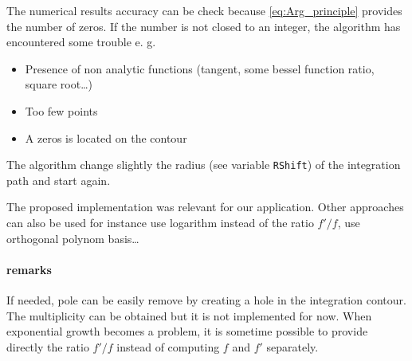 \documentclass[a4paper,10pt]{article}
\begin{document}

%





The numerical results accuracy can be check because \eqref{eq:Arg_principle} provides the number of zeros. If the number is not closed to an integer, the algorithm has encountered some trouble e. g. 
\begin{itemize}
\item Presence of non analytic functions (tangent, some bessel function ratio, square root\dots)
\item Too few points
\item A zeros is located on the contour
\end{itemize}
The algorithm change slightly the radius (see variable \texttt{RShift}) of the integration path and start again.

The proposed implementation was relevant for our application. Other approaches can also be used for instance use logarithm instead of the ratio $f'/f$, use orthogonal polynom basis\dots


\paragraph{remarks}
If needed, pole can be easily remove by creating a hole in the integration contour. The multiplicity can be obtained but it is not implemented for now. When exponential growth becomes a problem, it is sometime possible to provide directly the ratio $f'/f$ instead of computing $f$ and $f'$ separately.
\end{document}
